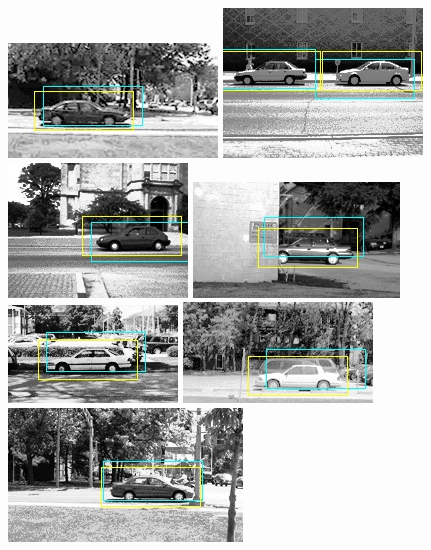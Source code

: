 \begin{figure}
\centering

\includegraphics[scale=0.75]{test-0_good.jpg}
\includegraphics[scale=0.75]{test-10_good.jpg}
\includegraphics[scale=0.75]{test-14_good.jpg}
\includegraphics[scale=0.75]{test-16_good.jpg}
\includegraphics[scale=0.75]{test-20_good.jpg}
\includegraphics[scale=0.75]{test-21_good.jpg}
\includegraphics[scale=0.75]{test-22_good.jpg}

\end{figure}
